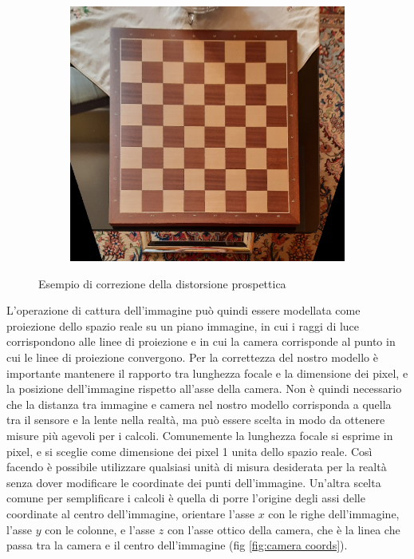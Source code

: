 \begin{figure}
\begin{subfigure}{.49\textwidth}
        \includegraphics[width=\textwidth]{images/persp2.png}
    \end{subfigure}
    \caption{Esempio di correzione della distorsione prospettica}
    \label{fig:projcorrected}
\end{figure}

L'operazione di cattura dell'immagine può quindi essere modellata come proiezione dello spazio reale su un piano immagine, in cui i raggi di luce corrispondono alle linee di proiezione e in cui la camera corrisponde al punto in cui le linee di proiezione convergono.
Per la correttezza del nostro modello è importante mantenere il rapporto tra lunghezza focale e la dimensione dei pixel, e la posizione dell'immagine rispetto all'asse della camera.
Non è quindi necessario che la distanza tra immagine e camera nel nostro modello corrisponda a quella tra il sensore e la lente nella realtà, ma può essere scelta in modo da ottenere misure più agevoli per i calcoli.
Comunemente la lunghezza focale si esprime in pixel, e si sceglie come dimensione dei pixel 1 unita dello spazio reale.
Così facendo è possibile utilizzare qualsiasi unità di misura desiderata per la realtà senza dover modificare le coordinate dei punti dell'immagine.
Un'altra scelta comune per semplificare i calcoli è quella di porre l'origine degli assi delle coordinate al centro dell'immagine, orientare l'asse $x$ con le righe dell'immagine, l'asse $y$ con le colonne, e l'asse $z$ con l'asse ottico della camera, che è la linea che passa tra la camera e il centro dell'immagine (fig \ref{fig:camera coords}).

